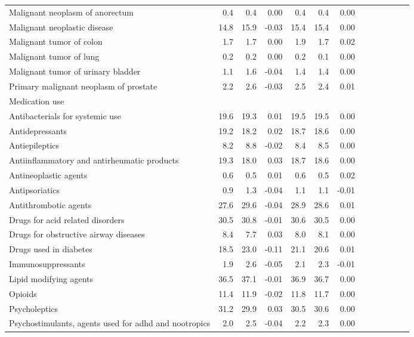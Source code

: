 \documentclass[11pt,]{article}
\begin{document}
\begin{longtable}{lrrrrrrrrrrrr}
      Malignant neoplasm of anorectum &   0.4 &   0.4 &  0.00 &   0.4 &   0.4 &  0.00 \\ 
      Malignant neoplastic disease &  14.8 &  15.9 & -0.03 &  15.4 &  15.4 &  0.00 \\ 
      Malignant tumor of colon &   1.7 &   1.7 &  0.00 &   1.9 &   1.7 &  0.02 \\ 
      Malignant tumor of lung &   0.2 &   0.2 &  0.00 &   0.2 &   0.1 &  0.00 \\ 
      Malignant tumor of urinary bladder &   1.1 &   1.6 & -0.04 &   1.4 &   1.4 &  0.00 \\ 
      Primary malignant neoplasm of prostate &   2.2 &   2.6 & -0.03 &   2.5 &   2.4 &  0.01 \\ 
  Medication use &     &     &     &     &     &     \\ 
      Antibacterials for systemic use &  19.6 &  19.3 &  0.01 &  19.5 &  19.5 &  0.00 \\ 
      Antidepressants &  19.2 &  18.2 &  0.02 &  18.7 &  18.6 &  0.00 \\ 
      Antiepileptics &   8.2 &   8.8 & -0.02 &   8.4 &   8.5 &  0.00 \\ 
      Antiinflammatory and antirheumatic products &  19.3 &  18.0 &  0.03 &  18.7 &  18.6 &  0.00 \\ 
      Antineoplastic agents &   0.6 &   0.5 &  0.01 &   0.6 &   0.5 &  0.02 \\ 
      Antipsoriatics &   0.9 &   1.3 & -0.04 &   1.1 &   1.1 & -0.01 \\ 
      Antithrombotic agents &  27.6 &  29.6 & -0.04 &  28.9 &  28.6 &  0.01 \\ 
      Drugs for acid related disorders &  30.5 &  30.8 & -0.01 &  30.6 &  30.5 &  0.00 \\ 
      Drugs for obstructive airway diseases &   8.4 &   7.7 &  0.03 &   8.0 &   8.1 &  0.00 \\ 
      Drugs used in diabetes &  18.5 &  23.0 & -0.11 &  21.1 &  20.6 &  0.01 \\ 
      Immunosuppressants &   1.9 &   2.6 & -0.05 &   2.1 &   2.3 & -0.01 \\ 
      Lipid modifying agents &  36.5 &  37.1 & -0.01 &  36.9 &  36.7 &  0.00 \\ 
      Opioids &  11.4 &  11.9 & -0.02 &  11.8 &  11.7 &  0.00 \\ 
      Psycholeptics &  31.2 &  29.9 &  0.03 &  30.5 &  30.6 &  0.00 \\ 
      Psychostimulants, agents used for adhd and nootropics &   2.0 &   2.5 & -0.04 &   2.2 &   2.3 &  0.00 \\ 
   \bottomrule\end{longtable}
\end{document}
